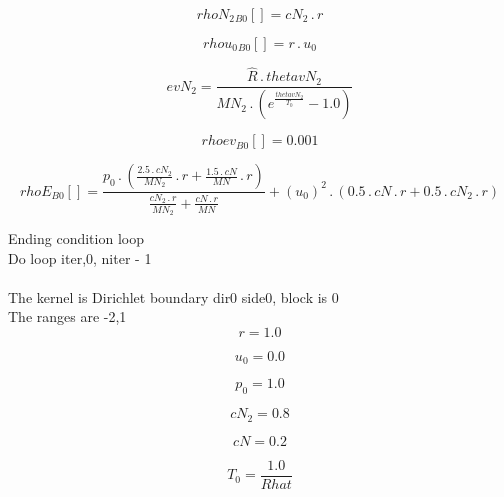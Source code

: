 \documentclass{article}
\begin{document}
\begin{dmath}{rhoN_{2}{_{B0}}}[{}] = cN_{2} \,.\, r\end{dmath}

\begin{dmath}{rhou_{0}{_{B0}}}[{}] = r \,.\, u_{0}\end{dmath}

\begin{dmath}evN_{2} = \frac{\hat{R} \,.\, thetavN_{2}}{MN_{2} \,.\, \left(e^{\frac{thetavN_{2}}{T_{0}}} - 1.0\right)}\end{dmath}

\begin{dmath}{rhoev{_{B0}}}[{}] = 0.001\end{dmath}

\begin{dmath}{rhoE{_{B0}}}[{}] = \frac{p_{0} \,.\, \left(\frac{2.5 \,.\, cN_{2}}{MN_{2}} \,.\, r + \frac{1.5 \,.\, cN}{MN} \,.\, r\right)}{\frac{cN_{2} \,.\, r}{MN_{2}} + \frac{cN \,.\, r}{MN}} + \left(u_{0} \right)^{2} \,.\, \left(0.5 \,.\, cN \,.\, 
r + 0.5 \,.\, cN_{2} \,.\, r\right)\end{dmath}

\noindent Ending condition loop %
\\\noindent Do loop iter,0, niter - 1\\
\\\noindent The kernel is Dirichlet boundary dir0 side0, block is 0\\\noindent The ranges are -2,1\\\begin{dmath}r = 1.0\end{dmath}

\begin{dmath}u_{0} = 0.0\end{dmath}

\begin{dmath}p_{0} = 1.0\end{dmath}

\begin{dmath}cN_{2} = 0.8\end{dmath}

\begin{dmath}cN = 0.2\end{dmath}

\begin{dmath}T_{0} = \frac{1.0}{Rhat}\end{dmath}
\end{document}
